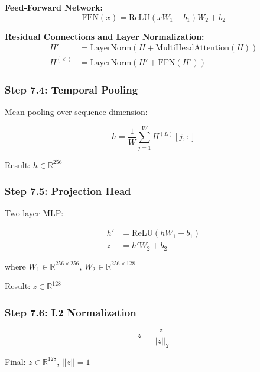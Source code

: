 \documentclass[12pt]{article}
\begin{document}
\textbf{Feed-Forward Network:}
\begin{equation}
\text{FFN}(x) = \text{ReLU}(xW_1 + b_1)W_2 + b_2
\end{equation}

\textbf{Residual Connections and Layer Normalization:}
\begin{equation}
\begin{aligned}
H' &= \text{LayerNorm}(H + \text{MultiHeadAttention}(H)) \\
H^{(\ell)} &= \text{LayerNorm}(H' + \text{FFN}(H'))
\end{aligned}
\end{equation}

\subsubsection{Step 7.4: Temporal Pooling}

Mean pooling over sequence dimension:

\begin{equation}
h = \frac{1}{W} \sum_{j=1}^{W} H^{(L)}[j, :]
\end{equation}

Result: $h \in \mathbb{R}^{256}$

\subsubsection{Step 7.5: Projection Head}

Two-layer MLP:

\begin{equation}
\begin{aligned}
h' &= \text{ReLU}(h W_1 + b_1) \\
z &= h' W_2 + b_2
\end{aligned}
\end{equation}

where $W_1 \in \mathbb{R}^{256 \times 256}$, $W_2 \in \mathbb{R}^{256 \times 128}$

Result: $z \in \mathbb{R}^{128}$

\subsubsection{Step 7.6: L2 Normalization}

\begin{equation}
z = \frac{z}{||z||_2}
\end{equation}

Final: $z \in \mathbb{R}^{128}$, $||z|| = 1$
\end{document}
